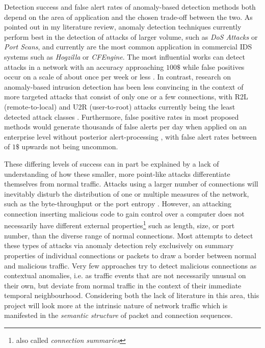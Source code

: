 \documentclass[a4paper,12pt,twoside]{report}
\begin{document}
Detection success and false alert rates of anomaly-based detection methods both depend on the area of application and the chosen trade-off between the two. As pointed out in my literature review, anomaly detection techniques currently perform best in the detection of attacks of larger volume, such as \textit{DoS Attacks} or \textit{Port Scans}, and currently are the most common application in commercial IDS systems such as \textit{Hogzilla} or \textit{CFEngine}. The most influential works can detect attacks in a network with an accuracy approaching $100\$$ while false positives occur on a scale of about once per week or less \cite{lakhina_diagnosing_2004,jiang2014transform,buczak_survey_2016}.
In contrast, research on anomaly-based intrusion detection has been less convincing in the context of more targeted attacks that consist of only one or a few connections, with R2L (remote-to-local) and U2R (user-to-root) attacks currently being the least detected attack classes \cite{nisioti2018intrusion}. Furthermore, false positive rates in most proposed methods would generate thousands of false alerts per day when applied on an enterprise level without posterior alert-processing \cite{sommer_outside_2010,ahmed2016survey,buczak_survey_2016}, with false alert rates between of $1\$$ upwards not being uncommon.

These differing levels of success can in part be explained by a lack of understanding of how these smaller, more point-like attacks differentiate themselves from normal traffic. Attacks using a larger number of connections will inevitably disturb the  distribution of one or multiple measures of the network, such as the byte-throughput or the port entropy \cite{lakhina2005mining}. However, an attacking connection inserting malicious code to gain control over a computer does not necessarily have different external properties\footnote{also called \textit{connection summaries}} such as length, size, or port number, than the diverse range of normal connections. Most attempts to detect these types of attacks via anomaly detection rely exclusively on summary properties of individual connections or packets to draw a border between normal and malicious traffic. Very few approaches try to detect malicious connections as contextual anomalies, i.e. as traffic events that are not necessarily unusual on their own, but deviate from normal traffic in the context of their immediate temporal neighbourhood. Considering both the lack of literature in this area, this project will look more at the intrinsic nature of network traffic which is manifested in the \textit{semantic structure} of packet and connection sequences. 
\end{document}

